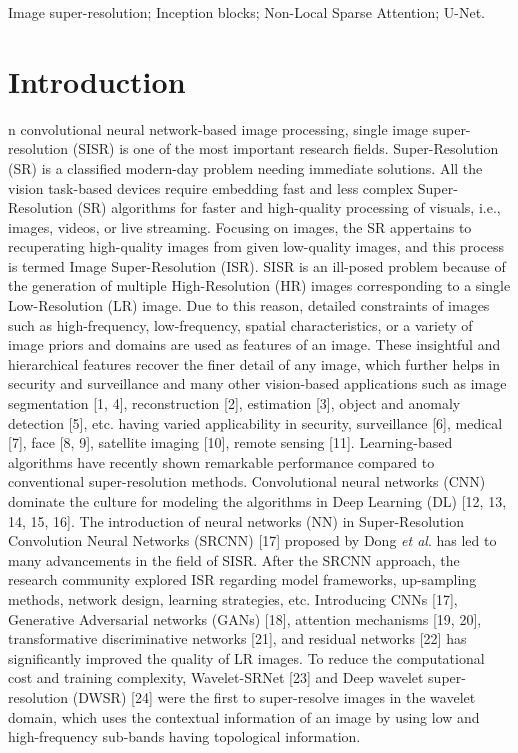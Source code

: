 \documentclass{ieeeaccess}
\begin{document}
\begin{keywords}
Image super-resolution; Inception blocks; Non-Local Sparse Attention; U-Net.
\end{keywords}

\titlepgskip=-15pt

\maketitle

\section{Introduction}
\label{sec:introduction}
n convolutional neural network-based image processing, single image super-resolution (SISR) is one of the most important research fields. Super-Resolution (SR) is a classified modern-day problem needing immediate solutions. All the vision task-based devices require embedding fast and less complex Super-Resolution (SR) algorithms for faster and high-quality processing of visuals, i.e., images, videos, or live streaming. Focusing on images, the SR appertains to recuperating high-quality images from given low-quality images, and this process is termed Image Super-Resolution (ISR). 
SISR is an ill-posed problem because of the generation of multiple High-Resolution (HR) images corresponding to a single Low-Resolution (LR) image. Due to this reason, detailed constraints of images such as high-frequency, low-frequency, spatial characteristics, or a variety of image priors and domains are used as features of an image. These insightful and hierarchical features recover the finer detail of any image, which further helps in security and surveillance and many other vision-based applications such as image segmentation [1, 4], reconstruction [2], estimation [3],  object and anomaly detection [5], etc. having varied applicability in security, surveillance [6], medical [7], face [8, 9], satellite imaging [10], remote sensing [11].
Learning-based algorithms have recently shown remarkable performance compared to conventional super-resolution methods. Convolutional neural networks (CNN) dominate the culture for modeling the algorithms in Deep Learning (DL) [12, 13, 14, 15, 16]. The introduction of neural networks (NN) in Super-Resolution Convolution Neural Networks (SRCNN) [17] proposed by Dong \textit{et al}. has led to many advancements in the field of SISR. After the SRCNN approach, the research community explored ISR regarding model frameworks, up-sampling methods, network design, learning strategies, etc. Introducing CNNs [17], Generative Adversarial networks (GANs) [18], attention mechanisms [19, 20], transformative discriminative networks [21], and residual networks [22] has significantly improved the quality of LR images. To reduce the computational cost and training complexity, Wavelet-SRNet [23] and Deep wavelet super-resolution (DWSR) [24] were the first to super-resolve images in the wavelet domain, which uses the contextual information of an image by using low and high-frequency sub-bands having topological information. 
\end{document}
